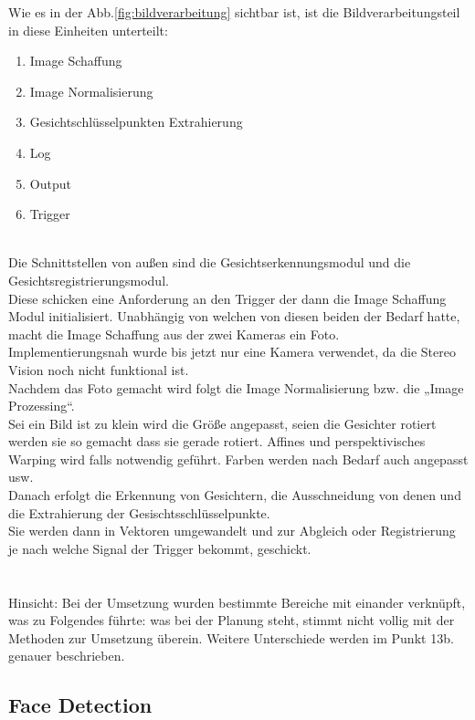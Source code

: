 Wie es in der Abb.\ref{fig:bildverarbeitung} sichtbar ist, ist die Bildverarbeitungsteil in diese Einheiten unterteilt:
\begin{enumerate}
	\item Image Schaffung
	\item Image Normalisierung
	\item Gesichtschlüsselpunkten Extrahierung
	\item Log
	\item Output 
	\item Trigger \\ \\
	
\end{enumerate}
Die Schnittstellen von außen sind die Gesichtserkennungsmodul und die Gesichtsregistrierungsmodul. \\ 
Diese schicken eine Anforderung an den Trigger der dann die Image Schaffung Modul initialisiert. Unabhängig von welchen von diesen beiden der Bedarf hatte, macht die Image Schaffung aus der zwei Kameras ein Foto. 
\\
Implementierungsnah wurde bis jetzt nur eine Kamera verwendet, da die Stereo Vision noch nicht funktional ist. \\
Nachdem das Foto gemacht wird folgt die Image Normalisierung bzw. die „Image Prozessing“. \\
Sei ein Bild ist zu klein wird die Größe angepasst, seien die Gesichter rotiert werden sie so gemacht dass sie gerade rotiert. Affines und perspektivisches Warping wird falls notwendig geführt. Farben werden nach Bedarf auch angepasst usw. \\
Danach erfolgt die Erkennung von Gesichtern, die Ausschneidung von denen und die Extrahierung der Gesischtsschlüsselpunkte.\\ Sie werden dann in Vektoren umgewandelt und zur Abgleich oder Registrierung je nach welche Signal der Trigger bekommt, geschickt. \\
\\
\\
Hinsicht: Bei der Umsetzung wurden bestimmte Bereiche mit einander verknüpft, was zu Folgendes führte: was bei der Planung steht, stimmt nicht vollig mit der Methoden zur Umsetzung überein. Weitere Unterschiede werden im Punkt 13b. genauer beschrieben.  \\

\subsection{Face Detection}

